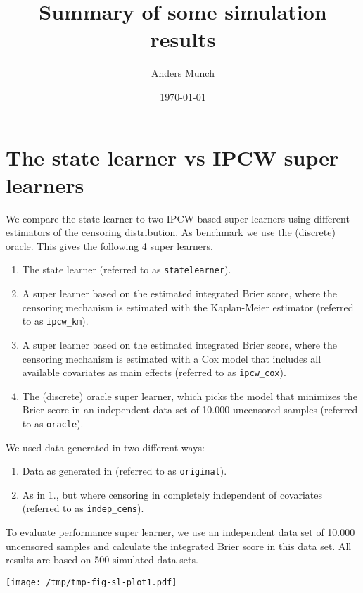 \documentclass[a4paper,danish]{article}
\author{Anders Munch}
\date{\today}
\title{Summary of some simulation results}
\begin{document}
\maketitle
\section{The state learner vs IPCW super learners}
\label{sec:org4c83351}

We compare the state learner to two IPCW-based super learners using different
estimators of the censoring distribution. As benchmark we use the (discrete)
oracle. This gives the following 4 super learners.


\begin{enumerate}
\item The state learner (referred to as \texttt{statelearner}).
\item A super learner based on the estimated integrated Brier score, where the
censoring mechanism is estimated with the Kaplan-Meier estimator (referred to
as \texttt{ipcw\_km}).
\item A super learner based on the estimated integrated Brier score, where the
censoring mechanism is estimated with a Cox model that includes all available
covariates as main effects (referred to as \texttt{ipcw\_cox}).
\item The (discrete) oracle super learner, which picks the model that minimizes the
Brier score in an independent data set of 10.000 uncensored samples (referred to
as \texttt{oracle}).
\end{enumerate}

We used data generated in two different ways:
\begin{enumerate}
\item Data as generated in \citep{gerds2013estimating} (referred to as \texttt{original}).
\item As in 1., but where censoring in completely independent of covariates
(referred to as \texttt{indep\_cens}).
\end{enumerate}

To evaluate performance super learner, we use an independent data set of 10.000
uncensored samples and calculate the integrated Brier score in this data set.
All results are based on 500 simulated data sets.

\begin{center}
\texttt{[image: /tmp/tmp-fig-sl-plot1.pdf]}
\end{center}
\end{document}
